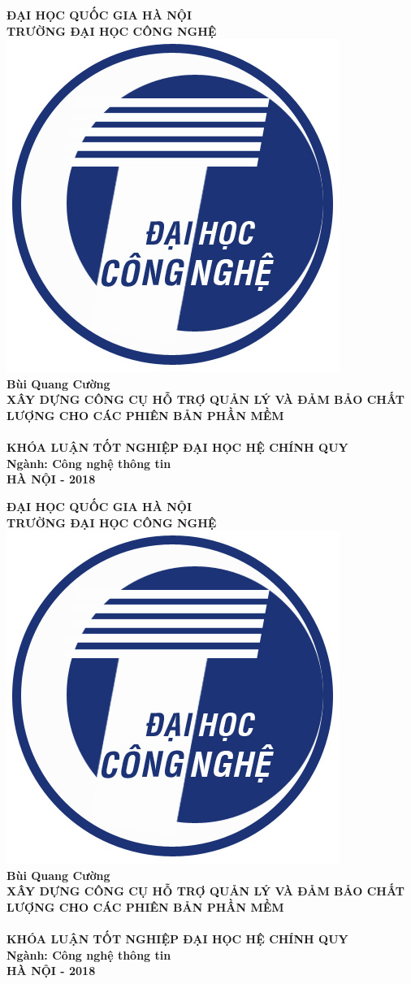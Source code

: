 \documentclass[12pt]{article}
\date{}
\begin{document}
\begin{titlepage}
	\center
	{\large \bfseries ĐẠI HỌC QUỐC GIA HÀ NỘI\\ TRƯỜNG ĐẠI HỌC CÔNG NGHỆ}\\[1cm]
	\includegraphics[width=0.2\linewidth]{images/uet}\\[1cm]
	{\Large  \bfseries Bùi Quang Cường}\\[2cm]
	{ \LARGE \bfseries XÂY DỰNG CÔNG CỤ HỖ TRỢ QUẢN LÝ VÀ ĐẢM BẢO CHẤT LƯỢNG CHO CÁC PHIÊN BẢN PHẦN MỀM}\\[0.5cm]
	\hfill\\[3cm]
	{\large \bfseries KHÓA LUẬN TỐT NGHIỆP ĐẠI HỌC HỆ CHÍNH QUY}\\	
	{\large \bfseries Ngành: Công nghệ thông tin}	
	\hfill\\[3cm]	
	{\large \bfseries HÀ NỘI - 2018}\\	
	\vfill
\end{titlepage}
	
\begin{titlepage}
	\center
	{\large \bfseries ĐẠI HỌC QUỐC GIA HÀ NỘI\\ TRƯỜNG ĐẠI HỌC CÔNG NGHỆ}\\[1cm]
	\includegraphics[width=0.2\linewidth]{images/uet}\\[1cm]
	{\Large  \bfseries Bùi Quang Cường}\\[2cm]		
	{ \LARGE \bfseries XÂY DỰNG CÔNG CỤ HỖ TRỢ QUẢN LÝ VÀ ĐẢM BẢO CHẤT LƯỢNG CHO CÁC PHIÊN BẢN PHẦN MỀM}\\[0.5cm]
	\hfill\\[3cm]
	{\large \bfseries KHÓA LUẬN TỐT NGHIỆP ĐẠI HỌC HỆ CHÍNH QUY}\\	
	{\large \bfseries Ngành: Công nghệ thông tin}		
	\hfill\\[3cm]		
	{\large \bfseries HÀ NỘI - 2018}\\		
	\vfill		
\end{titlepage}
	
\end{document}
